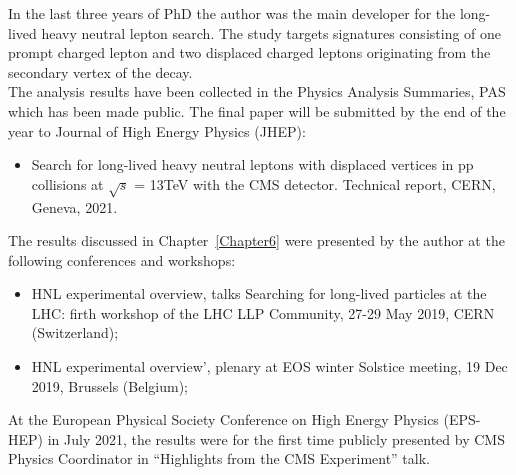 In the last three years of PhD the author was the main developer for the
long-lived heavy neutral lepton search. The study targets signatures
consisting of one prompt charged lepton and two displaced
charged leptons originating from the secondary vertex of the \hnl
decay.\\
The analysis results have been collected in the Physics Analysis
Summaries, PAS which has been made public. The final paper will be
submitted by the end of the year to Journal
of High Energy Physics (JHEP):
\begin{itemize}
\setlength\itemsep{-0.1em}
\item Search for long-lived heavy neutral leptons with displaced vertices in pp collisions at $\sqrt{s}$ =
13TeV with the CMS detector. Technical report, CERN, Geneva, 2021.
\end{itemize}

The results discussed in Chapter~\ref{Chapter6} were presented by the author at the following
conferences and workshops:

\begin{itemize}
\setlength\itemsep{-0.1em}
\item HNL experimental overview, talks Searching for long-lived
  particles at the LHC: firth workshop of the LHC LLP Community, 27-29
  May 2019, CERN (Switzerland);
\item HNL experimental overview', plenary at EOS winter Solstice
  meeting, 19 Dec 2019, Brussels (Belgium);
\end{itemize}

At the European Physical Society Conference on High Energy Physics
(EPS-HEP) in July 2021, the results were for the first time publicly
presented by CMS Physics Coordinator in ``Highlights from the CMS
Experiment'' talk.

